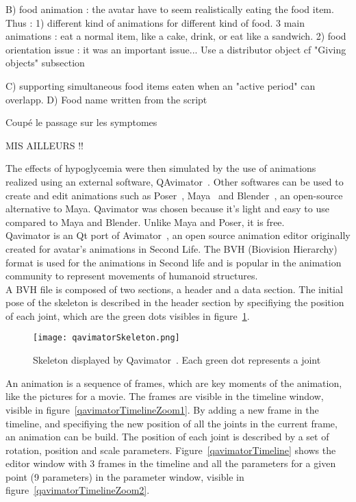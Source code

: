     B) food animation : the avatar have to seem realistically eating the food item. Thus :
        1) different kind of animations for different kind of food. 3 main animations : eat a normal item, like a cake, drink, or eat like a sandwich.
        2) food orientation issue : it was an important issue... Use a distributor object cf "Giving objects" subsection
    
    C) supporting simultaneous food items eaten when an "active period" can overlapp.
    D) Food name written from the script
    
\fi
 
Coupé le passage sur les symptomes

MIS AILLEURS !!

\iffalse

The effects of hypoglycemia were then simulated by the use of animations realized using an external software, QAvimator~\cite{qavimatorWebsite}. Other softwares can be used to create and edit animations such as Poser~\cite{PoserWebsite}, Maya~\cite{mayaWebsite} and Blender~\cite{BlenderWebsite}, an open-source alternative to Maya. Qavimator was chosen because it's light and easy to use compared to Maya and Blender. Unlike Maya and Poser, it is free.\\

Qavimator is an Qt port of Avimator~\cite{avimatorWebsite}, an open source animation editor originally created for avatar's animations in Second Life. The BVH (Biovision Hierarchy)~\cite{thingvold1999biovision} format is used for the animations in Second life and is popular in the animation community to represent movements of humanoid structures. \\

A BVH file is composed of two sections, a header and a data section. The initial pose of the skeleton is described in the header section by specifiying the position of each joint, which are the green dots visibles in figure~\ref{qavimatorSkeleton}. \\

\begin{figure}[h]
  \caption{Skeleton displayed by Qavimator~\cite{qavimatorWebsite}. Each green dot represents a joint}
  \centering
  \texttt{[image: qavimatorSkeleton.png]}
  \label{qavimatorSkeleton}
\end{figure}

An animation is a sequence of frames, which are key moments of the animation, like the pictures for a movie. The frames are visible in the timeline window, visible in figure~\ref{qavimatorTimelineZoom1}.
By adding a new frame in the timeline, and specifiying the new position of all the joints in the current frame, an animation can be build. The position of each joint is described by a set of rotation, position and scale parameters. Figure~\ref{qavimatorTimeline} shows the editor window with 3 frames in the timeline and all the parameters for a given point (9 parameters) in the parameter window, visible in figure~\ref{qavimatorTimelineZoom2}.

